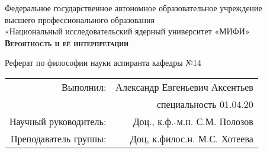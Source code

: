 
\begin{titlepage}
	\begin{center}
		
		{Федеральное государственное автономное образовательное учреждение\\			
			высшего профессионального образования\\		
			«Национальный исследовательский ядерный университет «МИФИ»} \\[2.4cm]
		
		
		
		\textsc{\textbf{Вероятность и её интерпретации} \\[2.4cm] }
		
		
	\end{center}
	
	
	\begin{flushright}
		Реферат по философии науки аспиранта кафедры №14
		\begin{tabular}{rr}
			Выполнил: & Александр Евгеньевич Аксентьев \\
			&	специальность 01.04.20 \\					
			Научный руководитель: & Доц., к.ф.-м.н.  С.М. Полозов 	\\
			Преподаватель группы: & Доц, к.филос.н. М.С. Хотеева
		\end{tabular}
		
	\end{flushright}
	
	\vfill
	
	
	\begin{center}
		\the\year{}
	\end{center}
	
	
	
\end{titlepage}